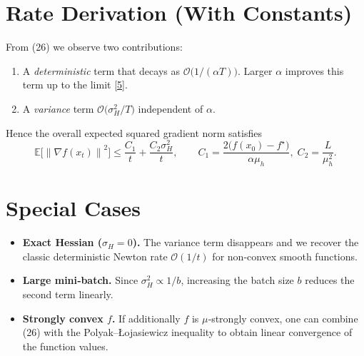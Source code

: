 \documentclass{article}
\newcommand{\E}{\mathbb{E}}
\newcommand{\norm}[1]{\left\|#1\right\|}
\begin{document}
\section*{Rate Derivation (With Constants)}
From (26) we observe two contributions:
\begin{enumerate}[label=(\alph*)]
    \item A \emph{deterministic} term that decays as $\mathcal{O}\!\bigl(1/(\alpha T)\bigr)$.  Larger $\alpha$ improves this term up to the limit \eqref{5}.
    \item A \emph{variance} term $\mathcal{O}\!\bigl(\sigma_{H}^{2}/T\bigr)$ independent of $\alpha$.
\end{enumerate}
Hence the overall expected squared gradient norm satisfies
\[
\E\!\bigl[\norm{\nabla f(x_t)}^{2}\bigr]\le
\frac{C_{1}}{t}+ \frac{C_{2}\sigma_{H}^{2}}{t},
\qquad
C_{1}= \frac{2\bigl(f(x_0)-f^{\star}\bigr)}{\alpha\mu_{\!h}},\;
C_{2}= \frac{L}{\mu_{\!h}^{2}}.
\]

\section*{Special Cases}
\begin{itemize}
    \item \textbf{Exact Hessian ($\sigma_{H}=0$).}  The variance term disappears and we recover the classic deterministic Newton rate $\mathcal{O}(1/t)$ for non‑convex smooth functions.
    \item \textbf{Large mini‑batch.}  Since $\sigma_{H}^{2}\propto 1/b$, increasing the batch size $b$ reduces the second term linearly.
    \item \textbf{Strongly convex $f$.}  If additionally $f$ is $\mu$‑strongly convex, one can combine (26) with the Polyak–Łojasiewicz inequality to obtain linear convergence of the function values.
\end{itemize}
\end{document}
